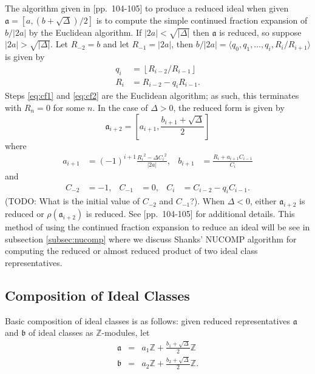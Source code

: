 \documentclass{ucalgthes1}
\theoremstyle{plain}
\theoremstyle{definition}
\newcommand{\ZZ}{\mathbb{Z}}
\newcommand{\floor}[1]{\left\lfloor #1 \right\rfloor}
\begin{document}
The algorithm given in \cite{Jac09}[pp.~104-105] to produce a reduced ideal when given $\mathfrak a = [a, (b+\sqrt\Delta)/2]$ is to compute the simple continued fraction expansion of $b/|2a|$ by the Euclidean algorithm.  If $|2a| < \sqrt{|\Delta|}$ then $\mathfrak a$ is reduced, so suppose $|2a| > \sqrt{|\Delta|}$.  Let $R_{-2}=b$ and let $R_{-1}=|2a|$, then $b/|2a| = \langle q_0, q_1, \dots, q_i, R_i/R_{i+1} \rangle$ is given by
\begin{align}
	q_i &= \floor{ R_{i-2}/R_{i-1} } \label{eq:cf1} \\
	R_i &= R_{i-2} - q_i R_{i-1}. \label{eq:cf2}
\end{align}
Steps \eqref{eq:cf1} and \eqref{eq:cf2} are the Euclidean algorithm; as such, this terminates with $R_n = 0$ for some $n$.  In the case of $\Delta>0$, the reduced form is given by
\[
	{\mathfrak a}_{i+2} = \left[ a_{i+1}, \frac{b_{i+1} + \sqrt\Delta}{2} \right]
\]
where
\begin{align*}
	a_{i+1} &= (-1)^{i+1} \frac{ {R_i}^2 -\Delta{C_i}^2 }{|2a|}, &
	b_{i+1} &= \frac{R_i + a_{i+1}C_{i-1}}{C_i}
\end{align*}
and
\begin{align*}
	C_{-2} &= -1, & 
	C_{-1} &= 0, &
	C_i &= C_{i-2} - q_i C_{i-1}.
\end{align*}
(TODO: What is the initial value of $C_{-2}$ and $C_{-1}$?).  When $\Delta<0$, either ${\mathfrak a}_{i+2}$ is reduced or $\rho({\mathfrak a}_{i+2})$ is reduced.  See \cite{Jac09}[pp.~104-105] for additional details.  This method of using the continued fraction expansion to reduce an ideal will be see in subsection \ref{subsec:nucomp} where we discuss Shanks' NUCOMP algorithm for computing the reduced or almost reduced product of two ideal class representatives.


\subsection{Composition of Ideal Classes}
Basic composition of ideal classes is as follows: given reduced representatives $\mathfrak{a}$ and $\mathfrak{b}$ of ideal classes as $\ZZ$-modules, let
\begin{eqnarray*}
	\mathfrak{a} & = & a_1 \ZZ + \frac{b_1 + \sqrt{\Delta}}{2} \ZZ \\
	\mathfrak{b} & = & a_2 \ZZ + \frac{b_2 + \sqrt{\Delta}}{2} \ZZ.
\end{eqnarray*}
\end{document}
